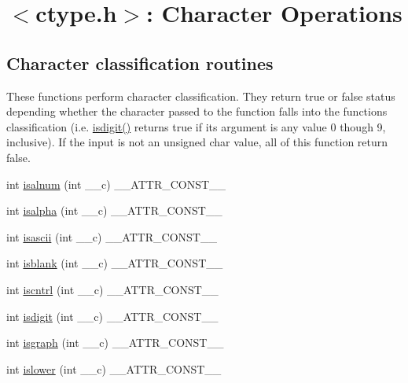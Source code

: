 \hypertarget{group__ctype}{}\section{$<$ctype.\+h$>$\+: Character Operations}
\label{group__ctype}
\subsection*{Character classification routines}
\label{_amgrp3cffbf32c02a5073ab67ade732f94ffb}%
These functions perform character classification. They return true or false status depending whether the character passed to the function falls into the function\textquotesingle{}s classification (i.\+e. \hyperlink{group__ctype_ga1676d7cad802db5e3e83813ce83ab9a0}{isdigit()} returns true if its argument is any value \textquotesingle{}0\textquotesingle{} though \textquotesingle{}9\textquotesingle{}, inclusive). If the input is not an unsigned char value, all of this function return false. \begin{DoxyCompactItemize}
\item 
int \hyperlink{group__ctype_gaebc8f9722cad75962de4053eda5c7ae3}{isalnum} (int \+\_\+\+\_\+c) \+\_\+\+\_\+\+A\+T\+T\+R\+\_\+\+C\+O\+N\+S\+T\+\_\+\+\_\+
\item 
int \hyperlink{group__ctype_ga3841660f03d72ad3f76fb5f8178fc236}{isalpha} (int \+\_\+\+\_\+c) \+\_\+\+\_\+\+A\+T\+T\+R\+\_\+\+C\+O\+N\+S\+T\+\_\+\+\_\+
\item 
int \hyperlink{group__ctype_ga28943008652a2c26c266c2f0572bb146}{isascii} (int \+\_\+\+\_\+c) \+\_\+\+\_\+\+A\+T\+T\+R\+\_\+\+C\+O\+N\+S\+T\+\_\+\+\_\+
\item 
int \hyperlink{group__ctype_ga2571d96058ec498e1c7493adeaff2e9d}{isblank} (int \+\_\+\+\_\+c) \+\_\+\+\_\+\+A\+T\+T\+R\+\_\+\+C\+O\+N\+S\+T\+\_\+\+\_\+
\item 
int \hyperlink{group__ctype_ga683dc5490fcbdbf149ffc5ae4701b34b}{iscntrl} (int \+\_\+\+\_\+c) \+\_\+\+\_\+\+A\+T\+T\+R\+\_\+\+C\+O\+N\+S\+T\+\_\+\+\_\+
\item 
int \hyperlink{group__ctype_ga1676d7cad802db5e3e83813ce83ab9a0}{isdigit} (int \+\_\+\+\_\+c) \+\_\+\+\_\+\+A\+T\+T\+R\+\_\+\+C\+O\+N\+S\+T\+\_\+\+\_\+
\item 
int \hyperlink{group__ctype_gafeb60935d2393d54a57545c3f54f9682}{isgraph} (int \+\_\+\+\_\+c) \+\_\+\+\_\+\+A\+T\+T\+R\+\_\+\+C\+O\+N\+S\+T\+\_\+\+\_\+
\item 
int \hyperlink{group__ctype_gaaddb38a750886eca0847f6ad07dd90da}{islower} (int \+\_\+\+\_\+c) \+\_\+\+\_\+\+A\+T\+T\+R\+\_\+\+C\+O\+N\+S\+T\+\_\+\+\_\+

\end{DoxyCompactItemize}
